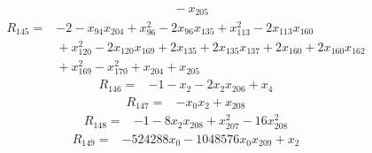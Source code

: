 {\begin{align*}
&{}  - x_{205}
\end{align*}
\begin{align*}
R_{145} ={}& -2 - x_{94} x_{204} + x_{96}^{2} - 2x_{96} x_{135} + x_{113}^{2} - 2x_{113} x_{160} \\
&{}  + x_{120}^{2} - 2x_{120} x_{169} + 2x_{135} + 2x_{135} x_{137} + 2x_{160} + 2x_{160} x_{162} \\
&{}  + x_{169}^{2} - x_{170}^{2} + x_{204} + x_{205}
\end{align*}
\begin{align*}
R_{146} ={}& -1 - x_{2} - 2x_{2} x_{206} + x_{4}
\end{align*}
\begin{align*}
R_{147} ={}& -x_{0} x_{2} + x_{208}
\end{align*}
\begin{align*}
R_{148} ={}& -1 - 8x_{2} x_{208} + x_{207}^{2} - 16x_{208}^{2}
\end{align*}
\begin{align*}
R_{149} ={}& -524288x_{0} - 1048576x_{0} x_{209} + x_{2}
\end{align*}
}
